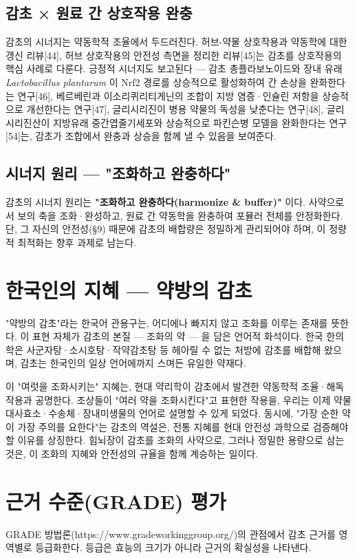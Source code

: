 \documentclass[11pt,oneside]{book}
\begin{document}
\subsection{감초 × 원료 간 상호작용 완충}
감초의 시너지는 약동학적 조율에서 두드러진다. 허브-약물 상호작용과 약동학에 대한 갱신 리뷰[44], 허브 상호작용의 안전성 측면을 정리한 리뷰[45]는 감초를 상호작용의 핵심 사례로 다룬다. 긍정적 시너지도 보고된다 — 감초 총플라보노이드와 장내 유래 \textit{Lactobacillus plantarum} 이 Nrf2 경로를 상승적으로 활성화하여 간 손상을 완화한다는 연구[46], 베르베린과 이소리퀴리티게닌의 조합이 지방 염증·인슐린 저항을 상승적으로 개선한다는 연구[47], 글리시리진이 병용 약물의 독성을 낮춘다는 연구[48], 글리시리진산이 지방유래 중간엽줄기세포와 상승적으로 파킨슨병 모델을 완화한다는 연구[54]는, 감초가 조합에서 완충과 상승을 함께 낼 수 있음을 보여준다.

\subsection{시너지 원리 — "조화하고 완충하다"}
감초의 시너지 원리는 \textbf{"조화하고 완충하다(harmonize \& buffer)"} 이다. 사약으로서 보의 축을 조화·완성하고, 원료 간 약동학을 완충하여 포뮬러 전체를 안정화한다. 단, 그 자신의 안전성(§9) 때문에 감초의 배합량은 정밀하게 관리되어야 하며, 이 정량적 최적화는 향후 과제로 남는다.

\section{한국인의 지혜 — 약방의 감초}
"약방의 감초"라는 한국어 관용구는, 어디에나 빠지지 않고 조화를 이루는 존재를 뜻한다. 이 표현 자체가 감초의 본질 — 조화의 약 — 을 담은 언어적 화석이다. 한국 한의학은 사군자탕·소시호탕·작약감초탕 등 헤아릴 수 없는 처방에 감초를 배합해 왔으며, 감초는 한국인의 일상 언어에까지 스며든 유일한 약재다.

이 "여럿을 조화시키는" 지혜는, 현대 약리학이 감초에서 발견한 약동학적 조율·해독 작용과 공명한다. 조상들이 "여러 약을 조화시킨다"고 표현한 작용을, 우리는 이제 약물대사효소·수송체·장내미생물의 언어로 설명할 수 있게 되었다. 동시에, "가장 순한 약이 가장 주의를 요한다"는 감초의 역설은, 전통 지혜를 현대 안전성 과학으로 검증해야 할 이유를 상징한다. 힘뇌장이 감초를 조화의 사약으로, 그러나 정밀한 용량으로 삼는 것은, 이 조화의 지혜와 안전성의 규율을 함께 계승하는 일이다.

\section{근거 수준(GRADE) 평가}
GRADE 방법론(https://www.gradeworkinggroup.org/)의 관점에서 감초 근거를 영역별로 등급화한다. 등급은 효능의 크기가 아니라 근거의 확실성을 나타낸다.
\end{document}
